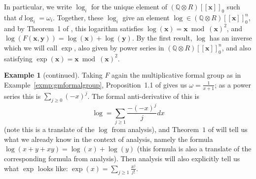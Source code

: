 \documentclass[12pt]{article}
\newcommand{\Q}{\mathbb{Q}}
\newcommand{\vx}{\mathbf{x}}
\newcommand{\vy}{\mathbf{y}}
\newcommand{\tensor}{\otimes}
\theoremstyle{plain}
\theoremstyle{definition}
\newtheorem{exmp}[thm]{Example} %
\theoremstyle{remark}
\begin{document}
In particular, we write $\log_i$ for the unique element of $(\Q\tensor R)[[\vx]]_0$ such that $d\log_i = \omega_i$. Together, these $\log_i$ give an element $\log \in (\Q\tensor R)[[\vx]]_0^n$, and by Theorem~1 of \cite{honda70}, this logarithm satisfies $\log(\vx) = \vx \bmod (\vx)^2$, and $\log(F(\vx,\vy)) = \log(\vx)+\log(\vy)$. By the first result, $\log$ has an inverse which we will call $\exp$, also given by power series in $(\Q\tensor R)[[\vx]]_0^n$, and also satisfying $\exp(\vx) = \vx \bmod (\vx)^2$.
\addtocounter{thm}{-1}
\begin{exmp}[continued]
Taking $F$ again the multiplicative formal group as in Example~\ref{exmp:gmformalgroup}, Proposition~1.1 of \cite{honda70} gives us $\omega = \frac{1}{x+1}$; as a power series this is $\sum_{j \geq 0} (-x)^j$. The formal anti-derivative of this is \[\log = \sum_{j \geq 1} \frac{-(-x)^j}{j}dx\] (note this is a translate of the $\log$ from analysis), and Theorem~$1$ of \cite{honda70} will tell us what we already know in the context of analysis, namely the formula $\log(x + y + xy) = \log(x)+\log(y)$ (this formula is also a translate of the corresponding formula from analysis). Then analysis will also explicitly tell us what $\exp$ looks like: $\exp(x) = \sum_{j \geq 1} \frac{x^j}{j!}$.
\end{exmp}
\addtocounter{thm}{2}
\end{document}
